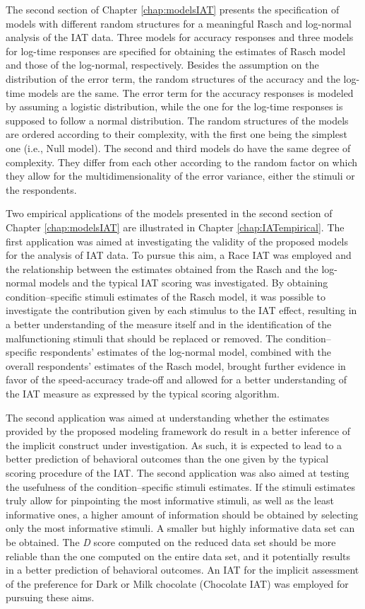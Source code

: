 \documentclass[12pt]{book}
\begin{document}
The second section of Chapter \ref{chap:modelsIAT} presents the specification of models with different random structures for a meaningful Rasch and log-normal analysis of the IAT data. 
Three models for accuracy responses and three models for log-time responses are specified for obtaining the estimates of Rasch model and those of the log-normal, respectively. 
Besides the assumption on the distribution of the error term, the random structures of the accuracy and the log-time models are the same. 
The error term for the accuracy responses is modeled by assuming a logistic distribution, while the one for the log-time responses is supposed to follow a normal distribution. 
The random structures of the models are ordered according to their complexity, with the first one being the simplest one (i.e., Null model). 
The second and third models do have the same degree of complexity. They differ from each other according to the random factor on which they allow for the multidimensionality of the error variance, either the stimuli or the respondents. 

Two empirical applications of the models presented in the second section of Chapter \ref{chap:modelsIAT} are illustrated in Chapter \ref{chap:IATempirical}.
The first application was aimed at investigating the validity of the proposed models for the analysis of IAT data. To pursue this aim, a Race IAT was employed and the relationship between the estimates obtained from the Rasch and the log-normal models and the typical IAT scoring was investigated. By obtaining condition--specific stimuli estimates of the Rasch model, it was possible to investigate the contribution given by each stimulus to the IAT effect, resulting in a better understanding of the measure itself and in the identification of the malfunctioning stimuli that should be replaced or removed. The condition--specific respondents' estimates of the log-normal model, combined with the overall respondents' estimates of the Rasch model, brought further evidence in favor of the speed-accuracy trade-off and allowed for a better understanding of the IAT measure as expressed by the typical scoring algorithm. 

The second application was aimed at understanding whether the estimates provided by the proposed modeling framework do result in a better inference of the implicit construct under investigation. As such, it is expected to lead to a better prediction of behavioral outcomes than the one given by the typical scoring procedure of the IAT. 
The second application was also aimed at testing the usefulness of the condition--specific stimuli estimates. If the stimuli estimates truly allow for pinpointing the most informative stimuli, as well as the least informative ones, a higher amount of information should be obtained by selecting only the most informative stimuli. A smaller but highly informative data set can be obtained.
The \emph{D} score computed on the reduced data set should be more reliable than the one computed on the entire data set, and it potentially results in a better prediction of behavioral outcomes.  
An IAT for the implicit assessment of the preference for Dark or Milk chocolate (Chocolate IAT) was employed for pursuing these aims. 
\end{document}
